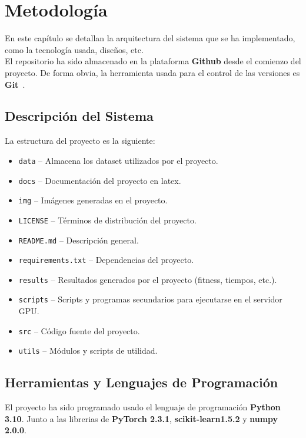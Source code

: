 \chapter{Metodología}\label{ch:Metodologia}
En este capítulo se detallan la arquitectura del sistema que se ha implementado, como la tecnología usada, diseños, etc.
\\[6pt]

El repositorio ha sido almacenado en la plataforma \textbf{Github} desde el comienzo del proyecto.
De forma obvia, la herramienta usada para el control de las versiones es \textbf{Git}~\cite{chacon2014pro}. \\[6pt]

\section{Descripción del Sistema}\label{sec:descripcion_del_sistema}
La estructura del proyecto es la siguiente:
\begin{itemize}
    \item \texttt{data} -- Almacena los dataset utilizados por el proyecto.
    \item \texttt{docs} -- Documentación del proyecto en latex.
    \item \texttt{img} -- Imágenes generadas en el proyecto.
    \item \texttt{LICENSE} -- Términos de distribución del proyecto.
    \item \texttt{README.md} -- Descripción general.
    \item \texttt{requirements.txt} -- Dependencias del proyecto.
    \item \texttt{results} -- Resultados generados por el proyecto (fitness, tiempos, etc.).
    \item \texttt{scripts} -- Scripts y programas secundarios para ejecutarse en el servidor GPU\@.
    \item \texttt{src} -- Código fuente del proyecto.
    \item \texttt{utils} -- Módulos y scripts de utilidad.
\end{itemize}

\section{Herramientas y Lenguajes de Programación}\label{sec:herramientas_y_lenguajes_de_programacion}
El proyecto ha sido programado usado el lenguaje de programación  \textbf{Python 3.10}.
Junto a las librerias de \textbf{PyTorch 2.3.1}, \textbf{scikit-learn1.5.2} y \textbf{numpy 2.0.0}. \\[6pt]


